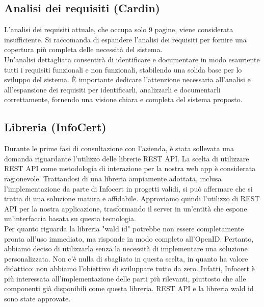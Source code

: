 \subsection{Analisi dei requisiti (Cardin)}
L'analisi dei requisiti attuale, che occupa solo 9 pagine, viene considerata insufficiente. Si raccomanda di espandere l'analisi dei requisiti per fornire una copertura più completa delle necessità del sistema.\\ Un'analisi dettagliata consentirà di identificare e documentare in modo esauriente tutti i requisiti funzionali e non funzionali, stabilendo una solida base per lo sviluppo del sistema.
È importante dedicare l'attenzione necessaria all'analisi e all'espansione dei requisiti per identificarli, analizzarli e documentarli correttamente, fornendo una visione chiara e completa del sistema proposto.


\subsection{Libreria (InfoCert)}
Durante le prime fasi di consultazione con l'azienda, è stata sollevata una domanda riguardante l'utilizzo delle librerie REST API. La scelta di utilizzare REST API come metodologia di interazione per la nostra web app è considerata ragionevole. Trattandosi di una libreria ampiamente adottata, inclusa l'implementazione da parte di Infocert in progetti validi, si può affermare che si tratta di una soluzione matura e affidabile. Approviamo quindi l'utilizzo di REST API per la nostra applicazione, trasformando il server in un'entità che espone un'interfaccia basata su questa tecnologia.
\\Per quanto riguarda la libreria "wald id" potrebbe non essere completamente pronta all'uso immediato, ma risponde in modo completo all'OpenID. Pertanto, abbiamo deciso di utilizzarla senza la necessità di implementare una soluzione personalizzata. Non c'è nulla di sbagliato in questa scelta, in quanto ha valore didattico: non abbiamo l'obiettivo di sviluppare tutto da zero. Infatti, Infocert è più interessata all'implementazione delle parti più rilevanti, piuttosto che alle componenti già disponibili come questa libreria.
REST API e  la libreria wald id sono state approvate.



